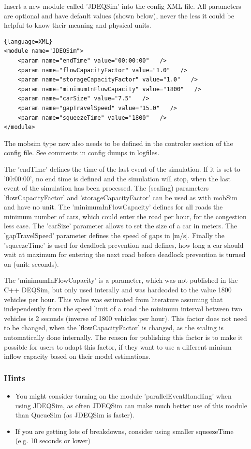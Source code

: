 Insert  a new module called 'JDEQSim' into the config XML file. All parameters  are optional and have default values (shown below), never the less it  could be helpful to know their meaning and physical units.
\begin{lstlisting}{language=XML}
<module name="JDEQSim">
    <param name="endTime" value="00:00:00"   />
    <param name="flowCapacityFactor" value="1.0"   />
    <param name="storageCapacityFactor" value="1.0"   />
    <param name="minimumInFlowCapacity" value="1800"   />
    <param name="carSize" value="7.5"   />
    <param name="gapTravelSpeed" value="15.0"   />
    <param name="squeezeTime" value="1800"   />
</module>
\end{lstlisting}

The mobsim type now  also needs to be defined in the controler section of the config  file. See comments in config dumps in logfiles.

The  'endTime' defines the time of the last event of the simulation. If it is  set to '00:00:00', no end time is defined and the simulation will stop,  when the last event of the simulation has been processed. The (scaling)  parameters  'flowCapacityFactor' and 'storageCapacityFactor' can  be used as with mobSim and have no unit. The 'minimumInFlowCapacity'  defines for all roads the minimum number of cars, which could enter the  road per hour, for the congestion less case. The 'carSize' parameter  allows to set the size of a car in meters. The 'gapTravelSpeed'  parameter defines the speed of gaps in [m/s]. Finally the 'squeezeTime'  is used for deadlock prevention and defines, how long a car should wait  at maximum for entering the next road before deadlock prevention is  turned on (unit: seconds).

The 'minimumInFlowCapacity' is a  parameter, which was not published in the C++ DEQSim, but only used  interally and was hardcoded to the value 1800 vehicles per hour. This  value was estimated from literature assuming that independently from the  speed limit of a road the minimum interval between two vehicles is 2  seconds (inverse of 1800 vehicles per hour). This factor does not need  to be changed, when the 'flowCapacityFactor' is changed, as the scaling  is automatically done internally. The reason for publishing this factor  is to make it possible for users to adapt this factor, if they want to  use a different minium inflow capacity based on their model estimations.

\subsubsection{Hints}
\begin{itemize}
	\item You might consider turning on the module  'parallelEventHandling' when using JDEQSim, as often JDEQSim can make  much better use of this module than QueueSim (as JDEQSim is faster).
	\item If you are getting lots of breakdowns, consider using smaller squeezeTime (e.g. 10 seconds or lower)
\end{itemize}

